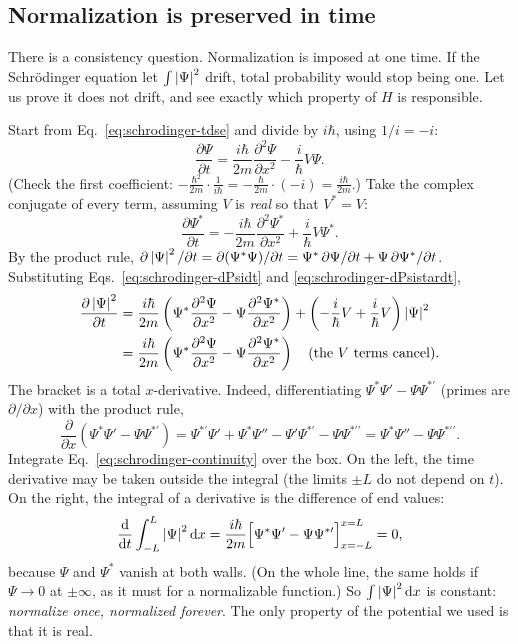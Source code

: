 \subsection{Normalization is preserved in time}

There is a consistency question. Normalization is imposed at one time. If the Schr\"odinger equation let $\int\left\lvert \Psi\right\rvert^2$ drift, total probability would stop being one. Let us prove it does not drift, and see exactly which property of $H$ is responsible.

Start from Eq.~\eqref{eq:schrodinger-tdse} and divide by $i\hbar$, using $1/i=-i$:
\begin{equation}
\frac{\partial\Psi}{\partial t}=\frac{i\hbar}{2m}\frac{\partial^2\Psi}{\partial x^2}-\frac{i}{\hbar}V\Psi.
\label{eq:schrodinger-dPsidt}
\end{equation}
(Check the first coefficient: $-\frac{\hbar^2}{2m}\cdot\frac1{i\hbar}=-\frac{\hbar}{2m}\cdot(-i)=\frac{i\hbar}{2m}$.) Take the complex conjugate of every term, assuming $V$ is \emph{real} so that $V^*=V$:
\begin{equation}
\frac{\partial\Psi^*}{\partial t}=-\frac{i\hbar}{2m}\frac{\partial^2\Psi^*}{\partial x^2}+\frac{i}{\hbar}V\Psi^*.
\label{eq:schrodinger-dPsistardt}
\end{equation}
By the product rule, $\partial\left\lvert \Psi\right\rvert^2/\partial t=\partial(\Psi^*\Psi)/\partial t=\Psi^*\,\partial\Psi/\partial t+\Psi\,\partial\Psi^*/\partial t$. Substituting Eqs.~\eqref{eq:schrodinger-dPsidt} and \eqref{eq:schrodinger-dPsistardt},
\begin{align}
\frac{\partial\left\lvert \Psi\right\rvert^2}{\partial t}
&=\frac{i\hbar}{2m}\left(\Psi^*\frac{\partial^2\Psi}{\partial x^2}-\Psi\frac{\partial^2\Psi^*}{\partial x^2}\right)
+\left(-\frac i\hbar V+\frac i\hbar V\right)\left\lvert \Psi\right\rvert^2\nonumber\\
&=\frac{i\hbar}{2m}\left(\Psi^*\frac{\partial^2\Psi}{\partial x^2}-\Psi\frac{\partial^2\Psi^*}{\partial x^2}\right)\quad\text{(the $V$ terms cancel)}.
\label{eq:schrodinger-continuity}
\end{align}
The bracket is a total $x$-derivative. Indeed, differentiating $\Psi^*\Psi'-\Psi\Psi^{*\prime}$ (primes are $\partial/\partial x$) with the product rule,
\[
\frac{\partial}{\partial x}\left(\Psi^*\Psi'-\Psi\Psi^{*\prime}\right)
=\Psi^{*\prime}\Psi'+\Psi^*\Psi''-\Psi'\Psi^{*\prime}-\Psi\Psi^{*\prime\prime}
=\Psi^*\Psi''-\Psi\Psi^{*\prime\prime}.
\]
Integrate Eq.~\eqref{eq:schrodinger-continuity} over the box. On the left, the time derivative may be taken outside the integral (the limits $\pm L$ do not depend on $t$). On the right, the integral of a derivative is the difference of end values:
\[
\frac{\mathrm{d}}{\mathrm{d} t}\int_{-L}^{L}\left\lvert \Psi\right\rvert^2\mathrm{d} x=\frac{i\hbar}{2m}\Big[\Psi^*\Psi'-\Psi\Psi^{*\prime}\Big]_{x=-L}^{x=L}=0,
\]
because $\Psi$ and $\Psi^*$ vanish at both walls. (On the whole line, the same holds if $\Psi\to0$ at $\pm\infty$, as it must for a normalizable function.) So $\int\left\lvert \Psi\right\rvert^2\mathrm{d} x$ is constant: \emph{normalize once, normalized forever}. The only property of the potential we used is that it is real.

